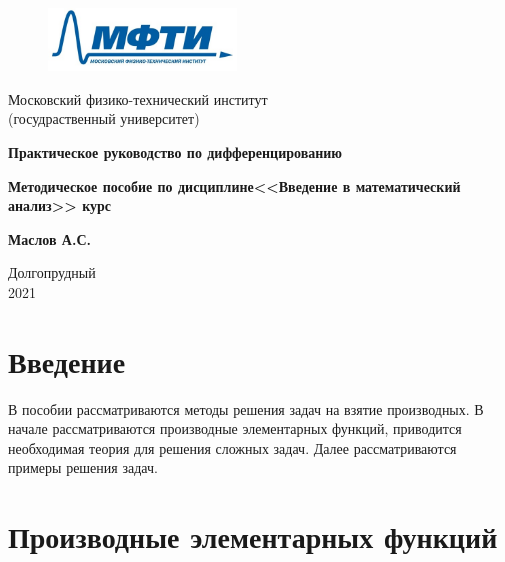 \documentclass[a4paper,fontsize=16pt]{article}
\begin{document}
\begin{figure}
\includegraphics[width=5cm]{MIPT_logo.png}
\end{figure}

\begin{center}
\normalsize Московский физико-технический институт \\(госудраственный университет)
\end{center}
\vspace{3cm}
\begin{center}

\textbf {\huge{Практическое руководство по дифференцированию}}

\vspace{0.5cm}

\textbf {\large{Методическое пособие по дисциплине\break <<Введение в математический анализ>>\break{} курс}}

\vspace{0.5cm}

\Large{{\textbf {Маслов А.С.}}}

\end{center}

\vspace{\fill}
\begin{center}
	Долгопрудный \\2021
\end{center}

\newpage

\tableofcontents

\newpage

\section{Введение}

\large{В пособии рассматриваются методы решения задач на взятие производных. В начале рассматриваются производные элементарных функций, приводится необходимая теория для решения сложных задач. Далее рассматриваются примеры решения задач.} 

\newpage

\section{Производные элементарных функций}
\end{document}
